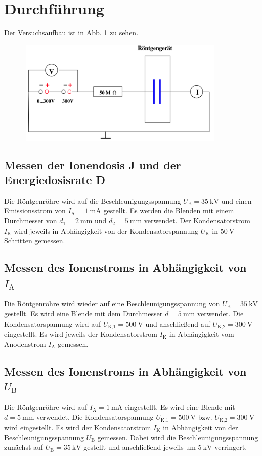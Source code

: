 \section{Durchführung}
\label{sec:Durchführung}

Der Versuchsaufbau ist in Abb. \ref{fig:aufbau} zu sehen.
\begin{figure}
    \centering
    \includegraphics[width=10cm, height=5cm]{build/aufbau.png}
    \caption{\cite{V607}}
    \label{fig:aufbau}
\end{figure}

\subsection{Messen der Ionendosis J und der Energiedosisrate D} %
Die Röntgenröhre wird auf die Beschleunigungsspannung
$U_\text{B} = \SI{35}{\kilo\volt}$ und einen Emissionsstrom 
von $I_\text{A} = \SI{1}{\milli\ampere}$ gestellt.
Es werden die Blenden mit einem Durchmesser von
$d_1 = \SI{2}{\milli\meter}$ und $d_2 = \SI{5}{\milli\meter}$ 
verwendet.
\newline
Der Kondensatorstrom $I_\text{K}$ wird jeweils in Abhängigkeit
von der Kondensatorspannung $U_\text{K}$ in $\SI{50}{\volt}$ 
Schritten gemessen.

\subsection{Messen des Ionenstroms in Abhängigkeit von $I_\text{A}$}
Die Röntgenröhre wird wieder auf eine Beschleunigungsspannung von
$U_\text{B} = \SI{35}{\kilo\volt}$ gestellt. Es wird eine
Blende mit dem Durchmesser $d = \SI{5}{\milli\meter}$
verwendet. Die Kondensatorspannung wird auf 
$U_\text{K,1} = \SI{500}{\volt}$ und anschließend auf
$U_\text{K,2} = \SI{300}{\volt}$ eingestellt.
\newline
Es wird jeweils der Kondensatorstrom $I_\text{K}$ in
Abhängigkeit vom Anodenstrom $I_\text{A}$ gemessen.

\subsection{Messen des Ionenstroms in Abhängigkeit von $U_\text{B}$}
Die Röntgenröhre wird auf $I_\text{A} = \SI{1}{\milli\ampere}$
eingestellt. Es wird eine Blende mit $d = \SI{5}{\milli\meter}$
verwendet. Die Kondensatorspannung $U_\text{K,1} = \SI{500}{\volt}$
bzw. $U_\text{K,2} = \SI{300}{\volt}$ wird eingestellt.
\newline
Es wird der Kondensatorstrom $I_\text{K}$ in Abhängigkeit von
der Beschleunigungsspannung $U_\text{B}$ gemessen.
Dabei wird die Beschleunigungsspannung zunächst auf
$U_\text{B} = \SI{35}{\kilo\volt}$ gestellt und anschließend
jeweils um $\SI{5}{\kilo\volt}$ verringert.
